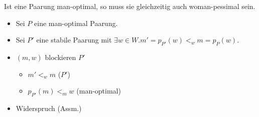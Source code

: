 \begin{frame}
  \begin{Lemma}
  \label{man_optimal_woman_pessimal}
    Ist eine Paarung man-optimal, so muss sie gleichzeitig auch woman-pessimal sein.
  \end{Lemma}

  \begin{Beweis}
  \label{man_optimal_woman_pessimal_bew}
    \begin{itemize} [<+->]
        \item Sei $P$ eine man-optimal Paarung.
        \item Sei $P'$ eine stabile Paarung mit $\exists w \in W.m' = p_{P'}(w) <_{w} m = p_{P}(w)$.
        \item $(m,w)$ blockieren $P'$
        \begin{itemize}
            \item $m' <_{w} m$ ($P'$)
            \item $p_{P'}(m) <_{m} w$ (man-optimal)
         \end{itemize}
        \item Widerspruch (Assm.)
     \end{itemize}
  \end{Beweis}
\end{frame}

